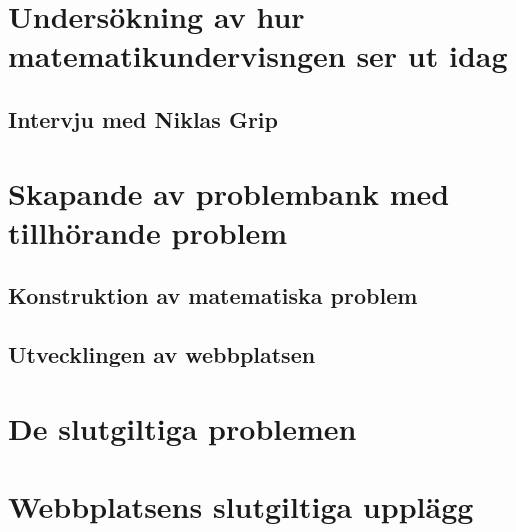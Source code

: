 \documentclass[11pt,a4paper]{article}
\begin{document}
\section{Undersökning av hur matematikundervisngen ser ut idag}
    
    
    
    \subsection{Intervju med Niklas Grip}
    
    \label{sec:intervju}
    
\section{Skapande av problembank med tillhörande problem}
    \label{sec:skapandetavproblembank}
    
    
    \subsection{Konstruktion av matematiska problem}
    \label{sec:Skapandetavproblem}
        

    \subsection{Utvecklingen av webbplatsen}
        
        
\section{De slutgiltiga problemen}
    
        
    
\section{Webbplatsens slutgiltiga upplägg}
    
    
\end{document}
